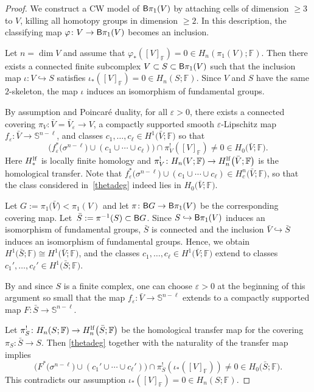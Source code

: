 \documentclass[pdftex]{sigma}
\numberwithin{equation}{section}
\newcommand{\F}{\mathbb{F}}
\newcommand{\SSS}{\mathbb{S}}
\newcommand{\eps}{\varepsilon}
\begin{document}
\begin{proof}
We construct a CW model of ${\sf B}\pi_1(V)$ by attaching cells of dimension $\geq 3$ to $V$, killing all homotopy groups in dimension $\geq 2$.
In this description, the classifying map $\varphi \colon V \to {\sf B}\pi_1(V)$ becomes an inclusion.

Let $n = \dim V$ and assume that $\varphi_*([V]_\F) = 0 \in H_n ( \pi_1(V) ; \F)$.
Then there exists a connected finite subcomplex $V \subset S \subset {\sf B}\pi_1(V)$ such that the inclusion map $\iota \colon V \hookrightarrow S$ satisfies $\iota_*([V]_{\F}) =0 \in H_n(S; \F)$.
Since $V$ and $S$ have the same $2$-skeleton, the map $\iota$ induces an isomorphism of fundamental groups.

By assumption and Poincar\'e duality, for all $\varepsilon > 0$, there exists a connected covering $\pi_V \colon \bar V = \bar V_\eps \to V$, a compactly supported smooth $\eps$-Lipschitz map $f_\eps \colon \bar V \to \SSS^{n-\ell}$, and classes $c_1, \ldots , c_{\ell} \in H^1\big(\bar V; \F\big)$ so that
\begin{equation} \label{thetadeg}
 \big( f_\eps^*\big(\sigma^{n-\ell}\big) \cup (c_1 \cup \cdots \cup c_\ell ) \big) \cap \pi_V^!( [V]_{\F}) \neq 0 \in H_0 \big( \bar V; \F\big) .
\end{equation}
 Here $H_*^{\rm lf}$ is locally finite homology and $\pi_V^{!} \colon H_n(V ; \F) \to H^{\rm lf}_n\big( \bar V; \F\big)$ is the homological transfer.
Note that $f_\eps^*\big(\sigma^{n-\ell}\big) \cup (c_1 \cup \cdots \cup c_\ell ) \in H_c^n\big( \bar V; \F\big)$, so that the class considered in~\eqref{thetadeg} indeed lies in $H_0\big(\bar V; \F\big)$.

 Let $G := \pi_1\big(\bar V\big) < \pi_1(V)$ and let $\pi \colon {\sf B}G \to {\sf B}\pi_1(V)$ be the corresponding covering map.
Let~${\bar S := \pi^{-1}(S) \subset {\sf B}G}$.
Since $S \hookrightarrow {\sf B}\pi_1(V)$ induces an isomorphism of fundamental groups, $\bar S$ is connected and the inclusion $\bar V \hookrightarrow \bar S$ induces an isomorphism of fundamental groups.
Hence, we obtain $H^1\big(\bar S; \F\big) \cong H^1\big(\bar V; \F\big)$, and the classes $c_1, \ldots, c_\ell \in H^1\big(\bar V; \F\big)$ extend to classes $c_1', \ldots, c_\ell' \in H^1\big(\bar S; \F\big)$.

By \cite[Lemma 3.2]{BH10} and since $S$ is a finite complex, one can choose $\eps > 0$ at the beginning of this argument so small that the map $f_\eps \colon \bar V \to \SSS^{n-\ell}$ extends to a compactly supported map $F \colon \bar S \to \SSS^{n-\ell}$.

Let $\pi_S^! \colon H_n(S; \F) \to H^{\rm lf}_n\big(\bar S; \F\big)$ be the homological transfer map for the covering $\pi_S \colon \bar S \to S$.
Then \eqref{thetadeg} together with the naturality of the transfer map implies
\[
 \big( F^*\big(\sigma^{n-\ell}\big) \cup ( c_1' \cup \cdots \cup c_\ell') \big) \cap \pi_S^!(\iota_*( [V]_{\F})) \neq 0 \in H_0\big(\bar S; \F\big) .
\]
This contradicts our assumption $\iota_*([V]_\F) = 0 \in H_n(S; \F)$.
\end{proof}
\end{document}
